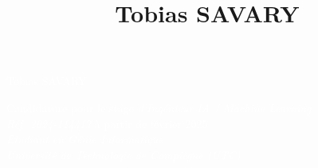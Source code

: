 \documentclass[9pt, oneside, a4paper, titlepage]{extarticle}
\title{Tobias SAVARY}
\date{}
\begin{document}
    
    \begin{tcolorbox}
        \begin{minipage}{0.3\linewidth}
            \hspace*{1cm}
        \end{minipage}%
        \hspace{1cm}%
        \begin{minipage}{0.6\linewidth}
            \begin{center}
                \Huge{\textcolor{white}{Tobias SAVARY}} \\
                \vspace*{0.5cm}
                
                \Large{\textcolor{white}{Candidature pour le stage \emph{d’Ingénieur IA / Machine Learning \\ Réf. 2024-114417} à partir de février 2025\\}}
                \vspace*{0.5cm}
                \Large{\textcolor{white}{\emph{Etudiant en Génie Informatique \\Université de Technologie de Compiègne (UTC) \\}}}
            \end{center}
        \end{minipage}%
    \end{tcolorbox}
\end{document}
